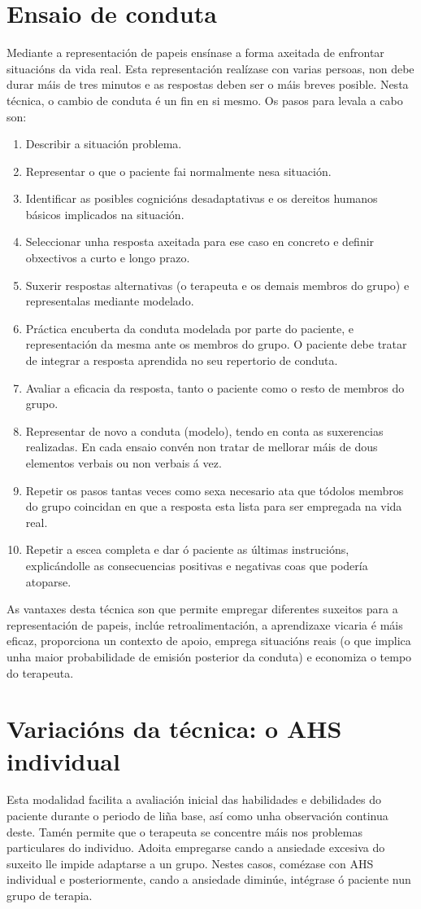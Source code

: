 \documentclass[a4paper,11pt]{article}
\begin{document}
\section{Ensaio de conduta}
Mediante a representación de papeis ensínase a forma axeitada de enfrontar situacións da vida real. Esta representación realízase con varias persoas, non debe durar máis de tres minutos e as respostas deben ser o máis breves posible. Nesta técnica, o cambio de conduta é un fin en si mesmo. Os pasos para levala a cabo son:
\begin{enumerate}
	\item Describir a situación problema.
	\item Representar o que o paciente fai normalmente nesa situación.
	\item Identificar as posibles cognicións desadaptativas e os dereitos humanos básicos implicados 
	na situación.
	\item Seleccionar unha resposta axeitada para ese caso en concreto e definir obxectivos a curto e 
	longo prazo.
	\item Suxerir respostas alternativas (o terapeuta e os demais membros do grupo) e representalas 
	mediante modelado.
	\item Práctica encuberta da conduta modelada por parte do paciente, e representación da mesma 
	ante os membros do grupo. O paciente debe tratar de integrar a resposta aprendida no seu 
	repertorio de conduta.
	\item Avaliar a eficacia da resposta, tanto o paciente como o resto de membros do grupo.
	\item Representar de novo a conduta (modelo), tendo en conta as suxerencias realizadas. En cada 
	ensaio convén non tratar de mellorar máis de dous elementos verbais ou non verbais á vez.
	\item Repetir os pasos tantas veces como sexa necesario ata que tódolos membros do grupo 
	coincidan en que a resposta esta lista para ser empregada na vida real. 
	\item Repetir a escea completa e dar ó paciente as últimas instrucións, explicándolle as 
	consecuencias positivas e negativas coas que podería atoparse. 
\end{enumerate}

As vantaxes desta técnica son que permite empregar diferentes suxeitos para a representación de papeis, inclúe retroalimentación, a aprendizaxe vicaria é máis eficaz, proporciona un contexto de apoio, emprega situacións reais (o que implica unha maior probabilidade de emisión posterior da conduta) e economiza o tempo do terapeuta.

\section{Variacións da técnica: o AHS individual}
Esta modalidad facilita a avaliación inicial das habilidades e debilidades do paciente durante o periodo de liña base, así como unha observación continua deste. Tamén permite que o terapeuta se concentre máis nos problemas particulares do individuo. Adoita empregarse cando a ansiedade excesiva do suxeito lle impide adaptarse a un grupo. Nestes casos, comézase con AHS individual e posteriormente, cando a ansiedade diminúe, intégrase ó paciente nun grupo de terapia. 
\end{document}
